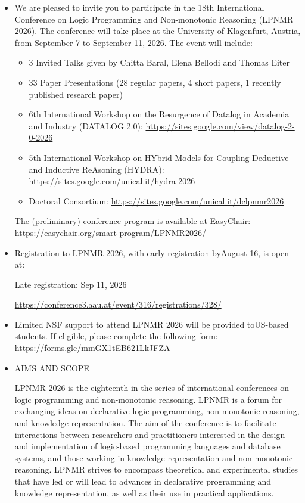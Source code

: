 \documentclass[prodmode,acmtecs]{acmsmall} %
\begin{document}
\begin{itemize}\item  We are pleased to invite you to participate in the 18th International Conference on Logic Programming and Non-monotonic Reasoning (LPNMR 2026). The conference will take place at the University of Klagenfurt, Austria, from September 7 to September 11, 2026. The event will include: 
 
\begin{itemize}\item  3 Invited Talks given by Chitta Baral, Elena Bellodi and Thomas Eiter
\item  33 Paper Presentations (28 regular papers, 4 short papers, 1 recently published research paper)
\item  6th International Workshop on the Resurgence of Datalog in Academia and Industry (DATALOG 2.0):   \href{https://sites.google.com/view/datalog-2-0-2026}{https://sites.google.com/view/datalog-2-0-2026}
\item  5th International Workshop on HYbrid Models for Coupling Deductive and Inductive ReAsoning (HYDRA):  \href{https://sites.google.com/unical.it/hydra-2026}{https://sites.google.com/unical.it/hydra-2026}
\item  Doctoral Consortium: \href{https://sites.google.com/unical.it/dclpnmr2026}{https://sites.google.com/unical.it/dclpnmr2026}
\end{itemize} 
  The (preliminary) conference program is available at EasyChair: \href{https://easychair.org/smart-program/LPNMR2026/}{https://easychair.org/smart-program/LPNMR2026/} 
 
\item  Registration to LPNMR 2026, with early registration byAugust 16, is open at: 
 
Late registration: Sep 11, 2026 
 
  \href{https://conference3.aau.at/event/316/registrations/328/}{https://conference3.aau.at/event/316/registrations/328/} 
 
\item  Limited NSF support to attend LPNMR 2026 will be provided toUS-based students. If eligible, please complete the following form: \href{https://forms.gle/mmGX1tEB621LkJFZA}{https://forms.gle/mmGX1tEB621LkJFZA} 
 
\item  AIMS AND SCOPE 
 
  LPNMR 2026 is the eighteenth in the series of international conferences on logic programming and non-monotonic reasoning. LPNMR is a forum for exchanging ideas on declarative logic programming, non-monotonic reasoning, and knowledge representation. The aim of the conference is to facilitate interactions between researchers and practitioners interested in the design and implementation of logic-based programming languages and database systems, and those working in knowledge representation and non-monotonic reasoning. LPNMR strives to encompass theoretical and experimental studies that have led or will lead to advances in declarative programming and knowledge representation, as well as their use in practical applications. 
 

\end{itemize}
\end{document}
